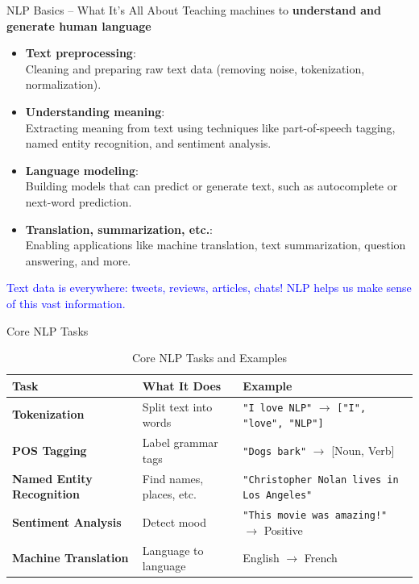 \begin{frame}[allowframebreaks]{NLP Basics – What It’s All About}
Teaching machines to \textbf{understand and generate human language}
\vspace{-1em}
\begin{itemize}
    \item \textbf{Text preprocessing}: \\
    {\small Cleaning and preparing raw text data (removing noise, tokenization, normalization).}
    \item \textbf{Understanding meaning}: \\
    {\small Extracting meaning from text using techniques like part-of-speech tagging, named entity recognition, and sentiment analysis.}
    \item \textbf{Language modeling}: \\
    {\small Building models that can predict or generate text, such as autocomplete or next-word prediction.}
    \item \textbf{Translation, summarization, etc.}: \\
    {\small Enabling applications like machine translation, text summarization, question answering, and more.}
\end{itemize}

\textcolor{blue}{Text data is everywhere: tweets, reviews, articles, chats! NLP helps us make sense of this vast information.}

\end{frame}

\begin{frame}[allowframebreaks]{Core NLP Tasks}
\begin{table}[ht]
    \centering
    \renewcommand{\arraystretch}{1.8} %
    \begin{tabular}{@{} p{} p{} p{} @{}}
        \toprule
        \textbf{Task} & \textbf{What It Does} & \textbf{Example} \\
        \midrule
        \hline %
        \textbf{Tokenization} & Split text into words & \texttt{"I love NLP"} $\rightarrow$ \texttt{["I", "love", "NLP"]} \\
        \textbf{POS Tagging} & Label grammar tags & \texttt{"Dogs bark"} $\rightarrow$ [Noun, Verb] \\
        \textbf{Named Entity Recognition} & Find names, places, etc. & \texttt{"Christopher Nolan lives in Los Angeles"} \\
        \textbf{Sentiment Analysis} & Detect mood & \texttt{"This movie was amazing!"} $\rightarrow$ Positive \\
        \textbf{Machine Translation} & Language to language & English $\rightarrow$ French \\
        \bottomrule
    \end{tabular}
    \caption*{Core NLP Tasks and Examples}
\end{table}
\end{frame}


